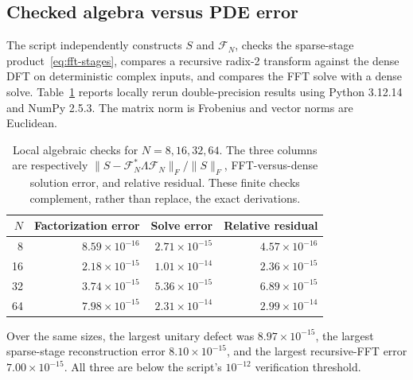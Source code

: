 \documentclass[11pt,a4paper]{article}
\numberwithin{equation}{section}
\begin{document}
\subsection{Checked algebra versus PDE error}
\label{sec:fft-checks}
The script  independently constructs $S$ and $\mathcal F_N$, checks the sparse-stage product~\eqref{eq:fft-stages}, compares a recursive radix-2 transform against the dense DFT on deterministic complex inputs, and compares the FFT solve with a dense solve. Table~\ref{tab:fft-algebra} reports locally rerun double-precision results using Python 3.12.14 and NumPy 2.5.3. The matrix norm is Frobenius and vector norms are Euclidean.
\begin{table}[htbp]
\centering\small
\caption{Local algebraic checks for $N=8,16,32,64$. The three columns are respectively $\|S-\mathcal F_N^*\Lambda\mathcal F_N\|_F/\|S\|_F$, FFT-versus-dense solution error, and relative residual. These finite checks complement, rather than replace, the exact derivations.}
\label{tab:fft-algebra}
\begin{tabular}{@{}rrrr@{}}
\toprule
$N$ & Factorization error & Solve error & Relative residual \\
\midrule
8  & $8.59\times10^{-16}$ & $2.71\times10^{-15}$ & $4.57\times10^{-16}$\\
16 & $2.18\times10^{-15}$ & $1.01\times10^{-14}$ & $2.36\times10^{-15}$\\
32 & $3.74\times10^{-15}$ & $5.36\times10^{-15}$ & $6.89\times10^{-15}$\\
64 & $7.98\times10^{-15}$ & $2.31\times10^{-14}$ & $2.99\times10^{-14}$\\
\bottomrule
\end{tabular}
\end{table}

Over the same sizes, the largest unitary defect was $8.97\times10^{-15}$, the largest sparse-stage reconstruction error $8.10\times10^{-15}$, and the largest recursive-FFT error $7.00\times10^{-15}$. All three are below the script's $10^{-12}$ verification threshold.
\end{document}
